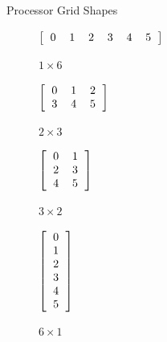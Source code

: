 \begin{frame}
\begin{block}{Processor Grid Shapes}
\begin{table}[ht]
        \centering
      \begin{subfigure}[b]{0.23\textwidth}
        \centering
        $\left[\begin{tabular}{llllll}
            0 & 1 & 2 & 3 & 4 & 5
          \end{tabular}\right]$
        \vspace{1.5cm}
        \caption{$1\times 6$}
      \end{subfigure}%
      \begin{subfigure}[b]{0.23\textwidth}
        \centering
        $\left[\begin{tabular}{lll}
            0 & 1 & 2\\
            3 & 4 & 5
          \end{tabular}\right]$
        \caption{$2\times 3$}
      \end{subfigure}%
      \begin{subfigure}[b]{0.23\textwidth}
        \centering
        $\left[\begin{tabular}{ll}
            0 & 1 \\
            2 & 3\\
            4 & 5
          \end{tabular}\right]$
        \caption{$3\times 2$}
      \end{subfigure}
      \begin{subfigure}[b]{0.23\textwidth}
        \centering
        $\left[\begin{tabular}{l}
            0 \\ 1 \\ 2 \\ 3 \\ 4 \\ 5
          \end{tabular}\right]$
        \caption{$6\times 1$}
      \end{subfigure}
        \caption{Processor Grid Shapes with 6 Processors}\label{fig:gridshapes}
\end{table}
\end{block}
\end{frame}

